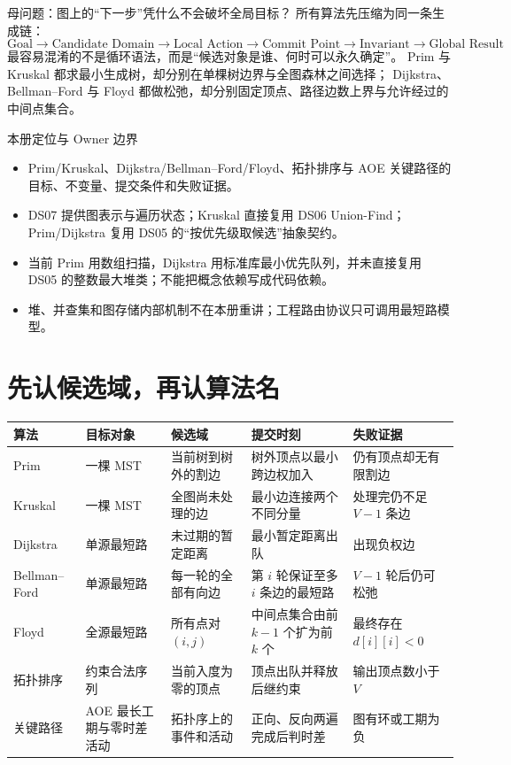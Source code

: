 \documentclass[UTF8,fontset=none,11pt,a4paper]{ctexart}
\begin{document}

\begin{corebox}{母问题：图上的“下一步”凭什么不会破坏全局目标？}
所有算法先压缩为同一条生成链：
\[
\boxed{\text{Goal}\to\text{Candidate Domain}\to\text{Local Action}
\to\text{Commit Point}\to\text{Invariant}\to\text{Global Result}}
\]
最容易混淆的不是循环语法，而是“候选对象是谁、何时可以永久确定”。
Prim 与 Kruskal 都求最小生成树，却分别在单棵树边界与全图森林之间选择；
Dijkstra、Bellman--Ford 与 Floyd 都做松弛，却分别固定顶点、路径边数上界与允许经过的中间点集合。
\end{corebox}

\begin{methodbox}{本册定位与 Owner 边界}
\begin{itemize}
  \item {}Prim/Kruskal、Dijkstra/Bellman--Ford/Floyd、拓扑排序与 AOE 关键路径的目标、不变量、提交条件和失败证据。
  \item {}DS07 提供图表示与遍历状态；Kruskal 直接复用 DS06 Union-Find；Prim/Dijkstra 复用 DS05 的“按优先级取候选”抽象契约。
  \item {}当前 Prim 用数组扫描，Dijkstra 用标准库最小优先队列，并未直接复用 DS05 的整数最大堆类；不能把概念依赖写成代码依赖。
  \item {}堆、并查集和图存储内部机制不在本册重讲；工程路由协议只可调用最短路模型。
\end{itemize}
\end{methodbox}

\tableofcontents
\newpage

\section{先认候选域，再认算法名}

\begin{center}\small
\begin{tabularx}{\linewidth}{L{1.8cm}Y Y Y Y}
\toprule
算法 & 目标对象 & 候选域 & 提交时刻 & 失败证据 \\
\midrule
Prim & 一棵 MST & 当前树到树外的割边 & 树外顶点以最小跨边权加入 & 仍有顶点却无有限割边 \\
Kruskal & 一棵 MST & 全图尚未处理的边 & 最小边连接两个不同分量 & 处理完仍不足 $V-1$ 条边 \\
Dijkstra & 单源最短路 & 未过期的暂定距离 & 最小暂定距离出队 & 出现负权边 \\
Bellman--Ford & 单源最短路 & 每一轮的全部有向边 & 第 $i$ 轮保证至多 $i$ 条边的最短路 & $V-1$ 轮后仍可松弛 \\
Floyd & 全源最短路 & 所有点对 $(i,j)$ & 中间点集合由前 $k-1$ 个扩为前 $k$ 个 & 最终存在 $d[i][i]<0$ \\
拓扑排序 & 约束合法序列 & 当前入度为零的顶点 & 顶点出队并释放后继约束 & 输出顶点数小于 $V$ \\
关键路径 & AOE 最长工期与零时差活动 & 拓扑序上的事件和活动 & 正向、反向两遍完成后判时差 & 图有环或工期为负 \\
\bottomrule
\end{tabularx}
\end{center}
\end{document}
